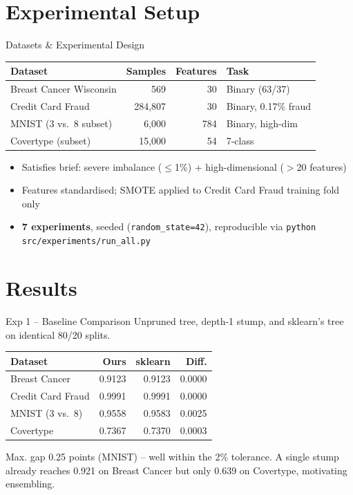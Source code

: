 \documentclass[aspectratio=169,11pt]{beamer}
\begin{document}
\section{Experimental Setup}
\begin{frame}{Datasets \& Experimental Design}
\begin{table}
\centering\small
\begin{tabular}{lrrl}
\toprule
Dataset & Samples & Features & Task \\
\midrule
Breast Cancer Wisconsin & 569 & 30 & Binary (63/37) \\
Credit Card Fraud & 284{,}807 & 30 & Binary, 0.17\% fraud \\
MNIST (3 vs.\ 8 subset) & 6{,}000 & 784 & Binary, high-dim \\
Covertype (subset) & 15{,}000 & 54 & 7-class \\
\bottomrule
\end{tabular}
\end{table}
\begin{itemize}
  \item Satisfies brief: severe imbalance ($\leq$1\%) + high-dimensional ($>$20 features)
  \item Features standardised; SMOTE applied to Credit Card Fraud training fold only
  \item \textbf{7 experiments}, seeded (\texttt{random\_state=42}), reproducible via
  \texttt{python src/experiments/run\_all.py}
\end{itemize}
\end{frame}

\section{Results}
\begin{frame}{Exp 1 -- Baseline Comparison}
Unpruned tree, depth-1 stump, and sklearn's tree on identical 80/20 splits.
\begin{table}
\centering\small
\begin{tabular}{lrrr}
\toprule
Dataset & Ours & sklearn & Diff.\\
\midrule
Breast Cancer & 0.9123 & 0.9123 & 0.0000 \\
Credit Card Fraud & 0.9991 & 0.9991 & 0.0000 \\
MNIST (3 vs.\ 8) & 0.9558 & 0.9583 & 0.0025 \\
Covertype & 0.7367 & 0.7370 & 0.0003 \\
\bottomrule
\end{tabular}
\end{table}
Max. gap 0.25 points (MNIST) -- well within the 2\% tolerance. A single stump
already reaches 0.921 on Breast Cancer but only 0.639 on Covertype, motivating ensembling.
\end{frame}
\end{document}
